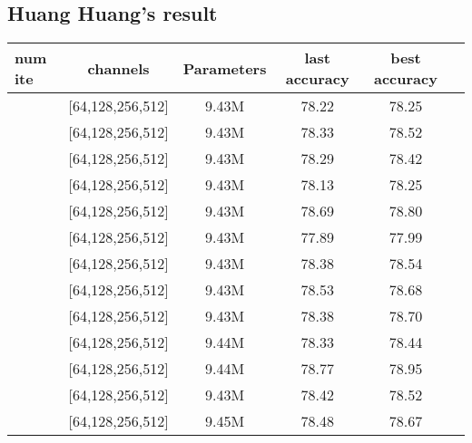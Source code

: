 \subsection{Huang Huang's result}
\begin{table}[H]
	\begin{tabular}{| l | c | c | c | c | r |}
		\hline
		num ite       &      channels           &    Parameters   &   last accuracy   &  best accuracy  \\
		\hline
		[2,2,2,2]      & [64,128,256,512]        &    9.43M        &    78.22          &  78.25          \\
		\hline
		[4,2,2,2]      & [64,128,256,512]        &    9.43M        &    78.33          &  78.52          \\
		\hline
		[8,2,2,2]      & [64,128,256,512]        &    9.43M        &    78.29          &  78.42          \\
		\hline
		[16,2,2,2]     & [64,128,256,512]        &    9.43M        &    78.13          &  78.25          \\
		\hline
		[32,2,2,2]     & [64,128,256,512]        &    9.43M        &    78.69          &  78.80          \\
		\hline
		[4,4,4,4]      & [64,128,256,512]        &    9.43M        &    77.89          &  77.99          \\
		\hline
		[3,3,5,2]      & [64,128,256,512]        &    9.43M        &    78.38          &  78.54          \\
		\hline
		[2,8,2,2]      & [64,128,256,512]        &    9.43M        &    78.53          &  78.68          \\
		\hline
		[2,2,8,2]      & [64,128,256,512]        &    9.43M        &    78.38          &  78.70          \\
		\hline
		[2,8,8,2]      & [64,128,256,512]        &    9.44M        &    78.33          &  78.44          \\
		\hline
		[2,2,16,2]     & [64,128,256,512]        &    9.44M        &    78.77          &  78.95          \\
		\hline
		[2,16,2,2]     & [64,128,256,512]        &    9.43M        &    78.42          &  78.52          \\
		\hline
		[2,2,32,2]     & [64,128,256,512]        &    9.45M        &    78.48          &  78.67          \\
		\hline
	\end{tabular}
\end{table}

